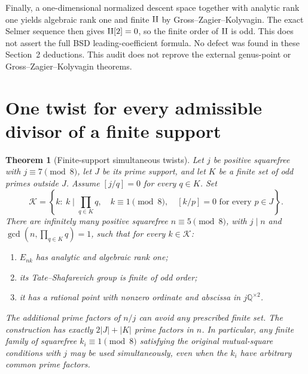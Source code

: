 \documentclass[11pt,a4paper]{article}
\newtheorem{theorem}{Theorem}[section]
\theoremstyle{remark}\newtheorem{remark}[theorem]{Remark}
\newcommand{\Q}{\mathbb Q}\newcommand{\Z}{\mathbb Z}\newcommand{\F}{\mathbb F}
\begin{document}
Finally, a one-dimensional normalized descent space together with
analytic rank one yields algebraic rank one and finite $\mathop{\amalg}$ by
Gross--Zagier--Kolyvagin. The exact Selmer sequence then gives
$\mathop{\amalg}[2]=0$, so the finite order of $\mathop{\amalg}$ is odd. This does not
assert the full BSD leading-coefficient formula. No defect was
found in these Section~2 deductions. This audit does not reprove
the external genus-point or Gross--Zagier--Kolyvagin theorems.

\section{One twist for every admissible divisor of a finite support}

\begin{theorem}[Finite-support simultaneous twists]\label{thm:finite}
Let $j$ be positive squarefree with $j\equiv7\pmod8$, let $J$
be its prime support, and let $K$ be a finite set of odd primes
outside $J$. Assume $[j/q]=0$ for every $q\in K$. Set
\[
 \mathcal K=\left\{k:\ k\mid\prod_{q\in K}q,\quad
 k\equiv1\pmod8,\quad[k/p]=0\text{ for every }p\in J\right\}.
\]
There are infinitely many positive squarefree $n\equiv5\pmod8$,
with $j\mid n$ and $\gcd(n,\prod_{q\in K}q)=1$, such that for
every $k\in\mathcal K$:
\begin{enumerate}
\item $E_{nk}$ has analytic and algebraic rank one;
\item its Tate--Shafarevich group is finite of odd order;
\item it has a rational point with nonzero ordinate and abscissa in
$j\Q^{\times2}$.
\end{enumerate}
The additional prime factors of $n/j$ can avoid any prescribed finite
set. The construction has exactly $2|J|+|K|$ prime factors in $n$.
In particular, any finite family of squarefree $k_i\equiv1\pmod8$
satisfying the original mutual-square conditions with $j$ may be used
simultaneously, even when the $k_i$ have arbitrary common prime factors.
\end{theorem}
\end{document}

